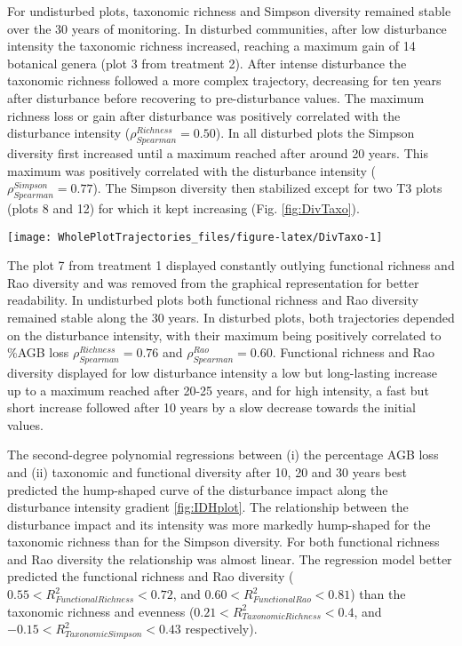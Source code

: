\documentclass[fleqn,10pt]{ArtEcoFoG} %
\begin{document}
For undisturbed plots, taxonomic richness and Simpson diversity remained
stable over the 30 years of monitoring. In disturbed communities, after
low disturbance intensity the taxonomic richness increased, reaching a
maximum gain of 14 botanical genera (plot 3 from treatment 2). After
intense disturbance the taxonomic richness followed a more complex
trajectory, decreasing for ten years after disturbance before recovering
to pre-disturbance values. The maximum richness loss or gain after
disturbance was positively correlated with the disturbance intensity
(\(\rho_{Spearman}^{Richness}=0.50\)). In all disturbed plots the
Simpson diversity first increased until a maximum reached after around
20 years. This maximum was positively correlated with the disturbance
intensity (\(\rho_{Spearman}^{Simpson}=0.77\)). The Simpson diversity
then stabilized except for two T3 plots (plots 8 and 12) for which it
kept increasing (Fig. \ref{fig:DivTaxo}).

\begin{figure*}

{\centering \texttt{[image: WholePlotTrajectories\_files/figure-latex/DivTaxo-1]} 

}

\caption{Trajectories over 30 years of the difference with the 1989 inventory (2 years after disturbance) of community taxonomic richness \textbf{(a)}, Simpson diversity \textbf{(b)}, functional richness \textbf{(c)}, and Rao diversity \textbf{(d)}. Shaded areas are the credibility intervals }\label{fig:DivTaxo}
\end{figure*}

The plot 7 from treatment 1 displayed constantly outlying functional
richness and Rao diversity and was removed from the graphical
representation for better readability. In undisturbed plots both
functional richness and Rao diversity remained stable along the 30
years. In disturbed plots, both trajectories depended on the disturbance
intensity, with their maximum being positively correlated to \%AGB loss
\(\rho_{Spearman}^{Richness}=0.76\) and \(\rho_{Spearman}^{Rao}=0.60\).
Functional richness and Rao diversity displayed for low disturbance
intensity a low but long-lasting increase up to a maximum reached after
20-25 years, and for high intensity, a fast but short increase followed
after 10 years by a slow decrease towards the initial values.

The second-degree polynomial regressions between (i) the percentage AGB
loss and (ii) taxonomic and functional diversity after 10, 20 and 30
years best predicted the hump-shaped curve of the disturbance impact
along the disturbance intensity gradient \ref{fig:IDHplot}. The
relationship between the disturbance impact and its intensity was more
markedly hump-shaped for the taxonomic richness than for the Simpson
diversity. For both functional richness and Rao diversity the
relationship was almost linear. The regression model better predicted
the functional richness and Rao diversity
(\(0.55<R^2_{Functional Richness}<0.72\), and
\(0.60<R^2_{Functional Rao}<0.81\)) than the taxonomic richness and
evenness (\(0.21<R^2_{Taxonomic Richness}<0.4\), and
\(-0.15<R^2_{Taxonomic Simpson}<0.43\) respectively).
\end{document}
